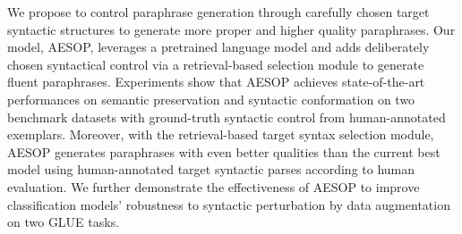 We propose to control paraphrase generation through carefully chosen target syntactic structures to generate more proper and higher quality paraphrases. Our model, AESOP, leverages a pretrained language model and adds deliberately chosen syntactical control via a retrieval-based selection module to generate fluent paraphrases. Experiments show that AESOP achieves state-of-the-art performances on semantic preservation and syntactic conformation on two benchmark datasets with ground-truth syntactic control from human-annotated exemplars. Moreover, with the retrieval-based target syntax selection module, AESOP generates paraphrases with even better qualities than the current best model using human-annotated target syntactic parses according to human evaluation. We further demonstrate the effectiveness of AESOP to improve classification models' robustness to syntactic perturbation by data augmentation on two GLUE tasks.
